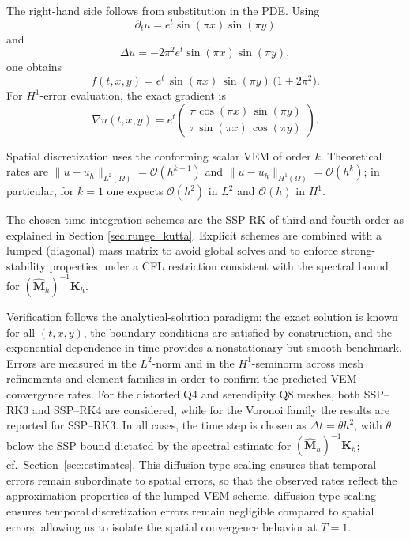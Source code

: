\documentclass{article}
\newcommand{\K}{\mathbf{K}_h}
\newcommand{\M}{\hat{\mathbf{M}}_h}
\begin{document}
The right-hand side follows from substitution in the PDE. Using
\begin{equation}
    \nonumber
    \partial_t u = e^{t}\sin(\pi x)\sin(\pi y)
\end{equation}
and
\begin{equation}
    \nonumber
    \Delta u = -2\pi^2 e^{t}\sin(\pi x)\sin(\pi y),
\end{equation}
one obtains
\begin{equation}
    \nonumber
    f(t,x,y) = e^{t}\,\sin(\pi x)\,\sin(\pi y)\,\big(1+2\pi^2\big).
\end{equation}
For $H^1$-error evaluation, the exact gradient is
\begin{equation}
    \nonumber
    \nabla u(t,x,y) = e^{t}\begin{pmatrix}
        \pi \cos(\pi x)\,\sin(\pi y)\\[2pt]
        \pi \sin(\pi x)\,\cos(\pi y)
    \end{pmatrix}.
\end{equation}

Spatial discretization uses the conforming scalar VEM of order $k$. Theoretical rates are $\|u-u_h\|_{L^2(\Omega)}=\mathcal{O}(h^{k+1})$ and $\|u-u_h\|_{H^1(\Omega)}=\mathcal{O}(h^{k})$; in particular, for $k=1$ one expects $\mathcal{O}(h^{2})$ in $L^2$ and $\mathcal{O}(h)$ in $H^1$.

The chosen time integration schemes are the SSP-RK of third and fourth order as explained in Section \ref{sec:runge_kutta}. Explicit schemes are combined with a lumped (diagonal) mass matrix to avoid global solves and to enforce strong-stability properties under a CFL restriction consistent with the spectral bound for $(\M)^{-1}\K$.

Verification follows the analytical-solution paradigm: the exact solution is known for all $(t,x,y)$, the boundary conditions are satisfied by construction, and the exponential dependence in time provides a nonstationary but smooth benchmark. Errors are measured in the $L^2$-norm and in the $H^1$-seminorm across mesh refinements and element families in order to confirm the predicted VEM convergence rates. For the distorted Q4 and serendipity Q8 meshes, both SSP--RK3 and SSP--RK4 are considered, while for the Voronoi family the results are reported for SSP--RK3. In all cases, the time step is chosen as $\Delta t=\theta h^2$, with $\theta$ below the SSP bound dictated by the spectral estimate for $(\M)^{-1}\K$; cf.~Section~\ref{sec:estimates}. This diffusion-type scaling ensures that temporal errors remain subordinate to spatial errors, so that the observed rates reflect the approximation properties of the lumped VEM scheme. diffusion-type scaling ensures temporal discretization errors remain negligible compared to spatial errors, allowing us to isolate the spatial convergence behavior at $T=1$.
\end{document}
